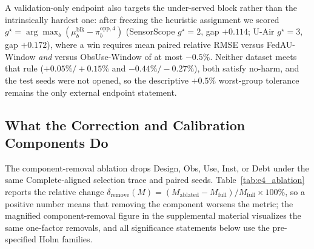 \documentclass[letterpaper,journal]{IEEEtran}
\begin{document}
A validation-only endpoint also targets the under-served block rather than the
intrinsically hardest one: after freezing the heuristic assignment we scored
$g^{\star}=\arg\max_b(\mu^{\mathrm{blk}}_b-\pi^{\mathrm{opp},4}_b)$
(SensorScope $g^{\star}=2$, gap $+0.114$; U-Air $g^{\star}=3$, gap $+0.172$),
where a win requires mean paired relative RMSE versus FedAU-Window \emph{and}
versus ObsUse-Window of at most $-0.5\%$.  Neither dataset meets that rule
($+0.05\%/+0.15\%$ and $-0.44\%/-0.27\%$), both satisfy no-harm, and the test
seeds were not opened, so the descriptive $+0.5\%$ worst-group tolerance remains
the only external endpoint statement.

\subsection{What the Correction and Calibration Components Do}
\label{subsec:eval_rq3}

The component-removal ablation drops Design, Obs, Use, Inst, or Debt under the
same Complete-aligned selection trace and paired seeds.
Table~\ref{tab:e4_ablation} reports the relative change
$\delta_{\mathrm{remove}}(M)
=(M_{\mathrm{ablated}}-M_{\mathrm{full}})/M_{\mathrm{full}}\times100\%$,
so a positive number means that removing the component worsens the metric; the
magnified component-removal figure in the supplemental material visualizes the
same one-factor removals, and all significance statements below use the
pre-specified Holm families.
\end{document}
